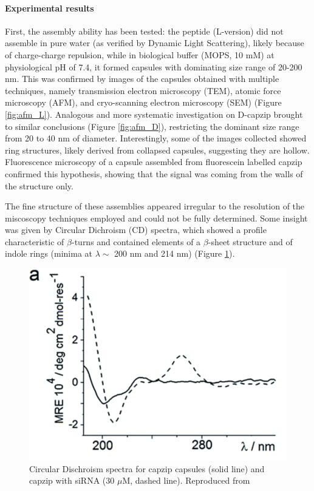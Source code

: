 \paragraph{Experimental results} First, the assembly ability has been tested: the peptide (L-version) did not assemble in pure water (as verified by Dynamic Light Scattering), likely because of charge-charge repulsion, while in biological buffer (MOPS, 10 mM) at physiological pH of 7.4, it formed capsules with dominating size range of 20-200 nm. This was confirmed by images of the capsules obtained with multiple techniques, namely transmission electron microscopy (TEM), atomic force microscopy (AFM), and cryo-scanning electron microscopy (SEM) (Figure \ref{fig:afm_L}).
%
Analogous and more systematic investigation on D-capzip brought to similar conclusions (Figure \ref{fig:afm_D}), restricting the dominant size range from 20 to 40 nm of diameter.
%
Interestingly, some of the images collected showed ring structures, likely derived from collapsed capsules, suggesting they are hollow. 
%
Fluorescence microscopy of a capsule assembled from fluorescein labelled capzip confirmed this hypothesis, showing that the signal was coming from the walls of the structure only.

The fine structure of these assemblies appeared irregular to the resolution of the miscoscopy techniques employed and could not be fully determined. Some insight was given by Circular Dichroism (CD) spectra, which showed a profile characteristic of $\beta$-turns and contained elements of a $\beta$-sheet structure and of indole rings (minima at $\lambda \sim$ 200 nm and 214 nm) (Figure \ref{fig:exp_CD}).

\begin{figure}
\begin{center}
\includegraphics[width=0.6\linewidth, align = c]{1introduction/pics/CD_capzip.png}
\caption[Circular Dischroism specturm of capzip capsules]{Circular Dischroism spectra for capzip  capsules (solid line) and capzip with siRNA (30 $\mu$M, dashed line). Reproduced from \citet{Castelletto2016}} \label{fig:exp_CD}
\end{center}
\end{figure}

